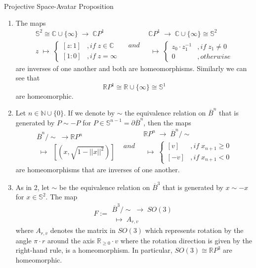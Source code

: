 \begin{proposition}{Projective Space-Avatar Proposition}\\
\begin{enumerate}
    \item The maps
    $$\substack{\mathbb{S}^2 \cong \mathbb{C} \cup \{ \infty\} \;\to\; \mathbb{C}P^1\\
    z \;\mapsto\; \begin{cases}
        [z:1] &,if\;z \in \mathbb{C}\\
        [1:0] &,if \;z= \infty
    \end{cases} } \;\;\;and\;\;\; \substack{\mathbb{C}P^1 \;\to\; \mathbb{C}\cup \{ \infty\} \cong \mathbb{S}^2 \\
    [z_0:z_1] \;\mapsto\; \begin{cases}
        z_0 \cdot z_1^{-1} &,if\;z_1 \neq 0\\
        0 &,otherwise
    \end{cases} }$$
    are inverses of one another and both are homeomorphisms. Similarly we can see that
    $$\mathbb{R}P^1 \cong \mathbb{R} \cup \{\infty\} \cong \mathbb{S}^1$$
    are homeomorphic.

    \item Let $n \in \mathbb{N} \cup \{0\}$. If we denote by $\sim$ the equivalence relation on $\overline{B}^n$ that is generated by $P \sim -P$ for $P \in \mathbb{S}^{n-1} = \partial \overline{B}^n$, then the maps
    $$\substack{\overline{B}^n/ \sim \;\to \mathbb{R}P^n\\
    [x] \;\mapsto\; \; [(x, \sqrt{1- ||x||^2})] } \;\;\;and\;\;\; \substack{\mathbb{R}P^n \;\to\; \overline{B}^n/ \sim\\
    [(v,x_{n+1})] \;\mapsto\; \begin{cases}
        [v] &,if\; x_{n+1} \geq 0\\
        [-v] &,if\; x_{n+1} <0
    \end{cases} }$$
    are homeomorphisms that are inverses of one another.

    \item As in 2, let $\sim$ be the equivalence relation on $\overline{B}^3$ that is generated by $x\sim -x$ for $x \in \mathbb{S}^2$. The map
    $$F:= \substack{\overline{B}^3/\sim \;\to\; SO(3)\\
    [r\cdot v] \;\mapsto\; A_{r,v} }$$
    where $A_{r,v}$ denotes the matrix in $SO(3)$ which represents rotation by the angle $\pi \cdot r$ around the axis $\mathbb{R}_{\geq 0} \cdot v$ where the rotation direction is given by the right-hand rule, is a homeomorphism. In particular, $SO(3) \cong \mathbb{R}P^3$ are homeomorphic.
\end{enumerate}
\end{proposition}

